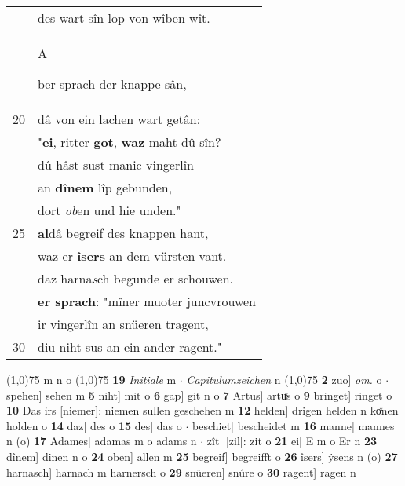 \documentclass[8pt,a4paper,notitlepage]{article}
\begin{document}
\begin{table}[ht]
\begin{minipage}[t]{0.5\linewidth}
\begin{tabular}{rl}
 & des wart sîn lop von wîben wît.\\ 
 & \begin{large}A\end{large}ber sprach der knappe sân,\\ 
20 & dâ von ein lachen wart getân:\\ 
 & "\textbf{ei}, ritter \textbf{got}, \textbf{waz} maht dû sîn?\\ 
 & dû hâst sust manic vingerlîn\\ 
 & an \textbf{dînem} lîp gebunden,\\ 
 & dort \textit{ob}en und hie unden."\\ 
25 & \textbf{al}dâ begreif des knappen hant,\\ 
 & waz er \textbf{îsers} an dem vürsten vant.\\ 
 & daz harna\textit{s}ch begunde er schouwen.\\ 
 & \textbf{er sprach}: "mîner muoter juncvrouwen\\ 
 & ir vingerlîn an snüeren tragent,\\ 
30 & diu niht sus an ein ander ragent."\\ 
\end{tabular}
\scriptsize
\line(1,0){75} \newline
m n o \newline
\line(1,0){75} \newline
\textbf{19} \textit{Initiale} m   $\cdot$ \textit{Capitulumzeichen} n  \newline
\line(1,0){75} \newline
\textbf{2} zuo] \textit{om.} o  $\cdot$ spehen] sehen m \textbf{5} niht] mit o \textbf{6} gap] git n o \textbf{7} Artus] artuͯs o \textbf{9} bringet] ringet o \textbf{10} Das irs [niemer]: niemen sullen geschehen m \textbf{12} helden] drigen helden n koͯnen holden o \textbf{14} daz] des o \textbf{15} des] das o  $\cdot$ beschiet] bescheidet m \textbf{16} manne] mannes n (o) \textbf{17} Adames] adamas m o adams n  $\cdot$ zît] [zil]: zit o \textbf{21} ei] E m o Er n \textbf{23} dînem] dinen n o \textbf{24} oben] allen m \textbf{25} begreif] begreifft o \textbf{26} îsers] ẏsens n (o) \textbf{27} harnasch] harnach m harnersch o \textbf{29} snüeren] snúre o \textbf{30} ragent] ragen n \newline
\end{minipage}
\end{table}
\newpage
\end{document}
